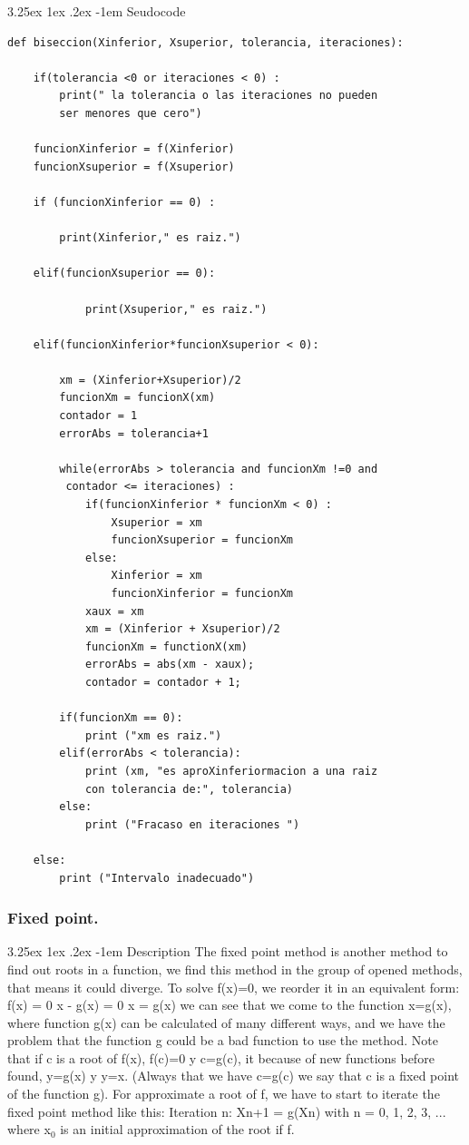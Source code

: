 \documentclass{article}
\makeatletter
\renewcommand\paragraph{\@startsection{paragraph}{5}{\z@}%
  {3.25ex \@plus1ex \@minus.2ex}%
  {-1em}%
  {\normalfont\normalsize\bfseries}}
\makeatother
\begin{document}
\paragraph{Seudocode}
\hfill \break
\begin{lstlisting}
def biseccion(Xinferior, Xsuperior, tolerancia, iteraciones):
	
	if(tolerancia <0 or iteraciones < 0) :
		print(" la tolerancia o las iteraciones no pueden 
		ser menores que cero")
	
	funcionXinferior = f(Xinferior)
	funcionXsuperior = f(Xsuperior)
		
	if (funcionXinferior == 0) :
			
		print(Xinferior," es raiz.")
			
	elif(funcionXsuperior == 0):
			
			print(Xsuperior," es raiz.")
			
	elif(funcionXinferior*funcionXsuperior < 0):
			
		xm = (Xinferior+Xsuperior)/2
		funcionXm = funcionX(xm)
		contador = 1
		errorAbs = tolerancia+1
		
		while(errorAbs > tolerancia and funcionXm !=0 and
		 contador <= iteraciones) :
			if(funcionXinferior * funcionXm < 0) :
				Xsuperior = xm
				funcionXsuperior = funcionXm
			else:		
				Xinferior = xm
				funcionXinferior = funcionXm
			xaux = xm
			xm = (Xinferior + Xsuperior)/2
			funcionXm = functionX(xm)
			errorAbs = abs(xm - xaux);
			contador = contador + 1;
		
		if(funcionXm == 0):
			print ("xm es raiz.")
		elif(errorAbs < tolerancia):
			print (xm, "es aproXinferiormacion a una raiz 
			con tolerancia de:", tolerancia)
		else:
			print ("Fracaso en iteraciones ")
		
	else:
		print ("Intervalo inadecuado")
\end{lstlisting}

\subsubsection{Fixed point.}

\paragraph{Description}
\hfill \break
The fixed point method is another method to find out roots in a function, we find this method in the group of opened methods, that means it could diverge. To solve f(x)=0, we reorder it in an equivalent form:
f(x) = 0
x - g(x) = 0
x = g(x)
we can see that we come to the function x=g(x), where function g(x) can be calculated of many different ways, and we have the problem that the function g could be a bad function to use the method.
Note that if c is a root of f(x), f(c)=0 y c=g(c), it because of new functions before found, y=g(x) y y=x. (Always that we have c=g(c) we say that c is a fixed point of the function g). For approximate a root of f, we have to start to iterate the fixed point method like this:
Iteration n: Xn+1 = g(Xn) with n = 0, 1, 2, 3, ... 
where x$_{0}$ is an initial approximation of the root if f.
\end{document}
